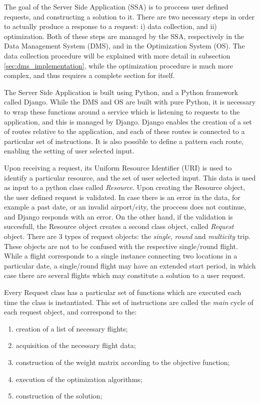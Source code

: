 The goal of the Server Side Application (SSA) is to proccess user defined requests,
and constructing a solution to it.
There are two necessary steps in order to actually produce a response to a request:
i) data collection, and ii) optimization.
Both of these steps are managed by the SSA, respectively in the Data Management System (DMS),
and in the Optimization System (OS). 
The data collection procedure will be explained with more detail in subsection \ref{sec:dms_implementation},
while the optimization procedure is much more complex, and thus requires a complete section for itself.

The Server Side Application is built using Python, and a Python framework called Django.
While the DMS and OS are built with pure Python, it is necessary to wrap these functions 
around a service which is listening to requests to the application,
and this is managed by Django. Django enables the creation of a set of routes 
relative to the application, and each of these routes 
is connected to a particular set of instructions. It is also possible to 
define a pattern each route, enabling the setting of user selected input.

Upon receiving a request, its Uniform Resource Identifier (URI) is used to identify a particular 
resource, and the set of user selected input. This data is used as input to a 
python class called \textit{Resource}. Upon creating the Resource object,
the user defined request is validated. In case there is an error in the data,
for example a past date, or an invalid airport/city, the proccess does not continue,
and Django responds with an error. On the other hand,
if the validation is succesfull, the Resource object creates a second class object,
called \textit{Request} object. There are 3 types of request objects: the \textit{single}, \textit{round} and \textit{multicity} trip.
These objects are not to be confused with the respective single/round flight.
While a flight corresponds to a single instance connecting two locations in a particular date,
a single/round flight may have an extended start period, in which case there are several flights 
which may constitute a solution to a user request.

Every Request class has a particular set of functions which are executed each time the class is instantiated.
This set of instructions are called the \textit{main} cycle of each request object,
and correspond to the:

\begin{enumerate}[noitemsep,topsep=0pt,parsep=0pt,partopsep=0pt]
  \item creation of a list of necessary flights;
  \item acquisition of the necessary flight data;
  \item construction of the weight matrix according to the objective function;
  \item execution of the optimization algorithms;
  \item construction of the solution;
\end{enumerate}

